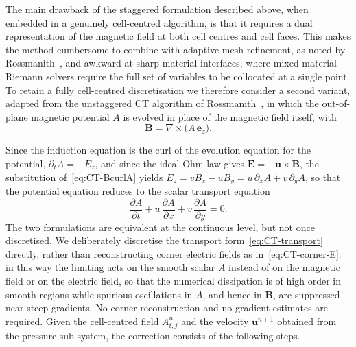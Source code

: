 \documentclass[a4paper,fleqn]{cas-sc}
\theoremstyle{definition}
\theoremstyle{remark}
\begin{document}
The main drawback of the staggered formulation described above, when embedded
in a genuinely cell-centred algorithm, is that it requires a dual
representation of the magnetic field at both cell centres and cell faces. This
makes the method cumbersome to combine with adaptive mesh refinement, as noted
by Rossmanith~\cite{Rossmanith2006}, and awkward at sharp material interfaces,
where mixed-material Riemann solvers require the full set of variables to be
collocated at a single point. %
To retain a fully cell-centred
discretisation we therefore consider a second variant, adapted from the
unstaggered CT algorithm of Rossmanith~\cite{Rossmanith2006}, in which the
out-of-plane magnetic potential $A$ is evolved in place of the magnetic field
itself, with
%
\begin{equation}
\label{eq:CT-BcurlA}
\mathbf B = \nabla\times\big(A\,\mathbf e_z\big).
\end{equation}

Since the induction equation is the curl of the evolution equation for the
potential, $\partial_t A = -E_z$, and since the ideal Ohm law gives
$\mathbf E=-\mathbf u\times\mathbf B$, the substitution
of~\eqref{eq:CT-BcurlA} yields
$E_z = v B_x - u B_y = u\,\partial_x A + v\,\partial_y A$, so that the potential
equation reduces to the scalar transport equation
%
\begin{equation}
\label{eq:CT-transport}
\frac{\partial A}{\partial t}
+ u\,\frac{\partial A}{\partial x}
+ v\,\frac{\partial A}{\partial y} = 0 .
\end{equation}
%
The two formulations are equivalent at the continuous level, but not once
discretised. We deliberately discretise the transport form~\eqref{eq:CT-transport}
directly, rather than reconstructing corner electric fields as
in~\eqref{eq:CT-corner-E}: in this way the limiting acts on the smooth scalar
$A$ instead of on the magnetic field or on the electric field, so that the
numerical dissipation is of high order in smooth regions while spurious
oscillations in $A$, and hence in $\mathbf B$, are suppressed near steep
gradients. No corner reconstruction and no gradient estimates are required.
Given the cell-centred field $A^n_{i,j}$ and the velocity $\mathbf u^{n+1}$
obtained from the pressure sub-system, the correction consists of the following
steps.
\end{document}
